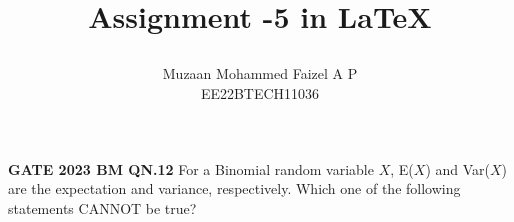 \documentclass[journal,12pt,twocolumn]{IEEEtran}
\providecommand{\pr}[1]{\ensuremath{\Pr\left(#1\right)}}
\providecommand{\cbrak}[1]{\ensuremath{\left\{#1\right\}}}
\begin{document}
\newtheorem{theorem}{Theorem}[section]
\newtheorem{problem}{Problem}
\newtheorem{proposition}{Proposition}[section]
\newtheorem{lemma}{Lemma}[section]
\newtheorem{corollary}[theorem]{Corollary}
\newtheorem{example}{Example}[section]
\newtheorem{definition}[problem]{Definition}
\newcommand{\BEQA}{\begin{eqnarray}}
\newcommand{\EEQA}{\end{eqnarray}}
\newcommand{\define}{\stackrel{\triangle}{=}}
\newcommand{\xor}{\oplus}


\providecommand{\mbf}{\mathbf}
\providecommand{\pr}[1]{\ensuremath{\Pr\left(#1\right)}}
\providecommand{\qfunc}[1]{\ensuremath{Q\left(#1\right)}}
\providecommand{\sbrak}[1]{\ensuremath{{}\left[#1\right]}}
\providecommand{\lsbrak}[1]{\ensuremath{{}\left[#1\right.}}
\providecommand{\rsbrak}[1]{\ensuremath{{}\left.#1\right]}}
\providecommand{\brak}[1]{\ensuremath{\left(#1\right)}}
\providecommand{\lbrak}[1]{\ensuremath{\left(#1\right.}}
\providecommand{\rbrak}[1]{\ensuremath{\left.#1\right)}}
\providecommand{\cbrak}[1]{\ensuremath{\left\{#1\right\}}}
\providecommand{\lcbrak}[1]{\ensuremath{\left\{#1\right.}}
\providecommand{\rcbrak}[1]{\ensuremath{\left.#1\right\}}}
\theoremstyle{remark}
\newtheorem{rem}{Remark}
\newcommand{\sgn}{\mathop{\mathrm{sgn}}}

\newcommand{\solution}{\noindent \textbf{Solution: }}
\newcommand{\cosec}{\,\text{cosec}\,}
\providecommand{\dec}[2]{\ensuremath{\overset{#1}{\underset{#2}{\gtrless}}}}
\newcommand{\myvec}[1]{\ensuremath{\begin{pmatrix}#1\end{pmatrix}}}
\newcommand{\mydet}[1]{\ensuremath{\begin{vmatrix}#1\end{vmatrix}}}

\let\vec\mathbf


\vspace{3cm}

\title{
  

  Assignment -5 in \LaTeX
    
  }
  \author{ Muzaan Mohammed Faizel A P\\
  EE22BTECH11036
  }	
\maketitle
\newpage
\bigskip
\renewcommand{\thefigure}{\theenumi}
\renewcommand{\thetable}{\theenumi}
\renewcommand{\thetable}{\arabic{table}} 
\textbf{GATE 2023 BM QN.12}
For a Binomial random variable $X$, E($X$) and Var($X$) are the expectation and
variance, respectively. Which one of the following statements CANNOT be true?
\begin{table}[ht!]
		\centering
		
		\caption{}
		\label{table:table1}	
\end{table}
\end{document}
